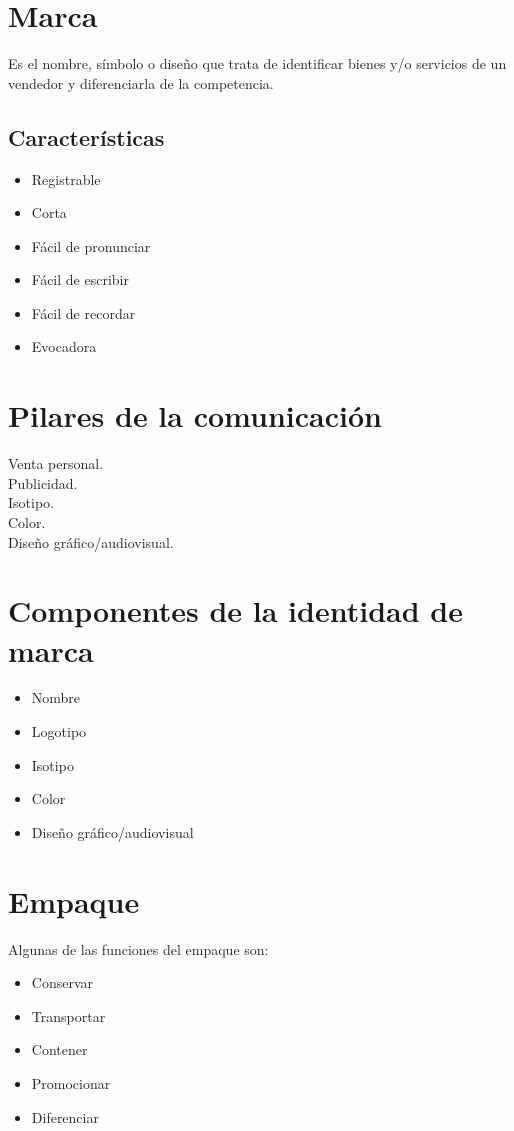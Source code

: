 \documentclass[12pt, spanish, a5paper]{article}
\begin{document}
\newpage

\section{Marca}

Es el nombre, símbolo o diseño que trata de identificar bienes y/o servicios de un vendedor y diferenciarla de la competencia.

\subsection{Características}
\begin{itemize}
	\item Registrable
	\item Corta
	\item Fácil de pronunciar
	\item Fácil de escribir
	\item Fácil de recordar
	\item Evocadora
\end{itemize}

\section{Pilares de la comunicación}

\begin{description}
	\item[Venta personal. ] 
	\item[Publicidad. ] 
	\item[Isotipo. ] 
	\item[Color. ]
	\item[Diseño gráfico/audiovisual. ] 
	
\end{description}



\section{Componentes de la identidad de marca}
\begin{itemize}
	\item Nombre
	\item Logotipo
	\item Isotipo
	\item Color
	\item Diseño gráfico/audiovisual
\end{itemize}

\section{Empaque}
Algunas de las funciones del empaque son:
\begin{itemize}
	\item Conservar
	\item Transportar
	\item Contener
	\item Promocionar
	\item Diferenciar
\end{itemize}
\end{document}

